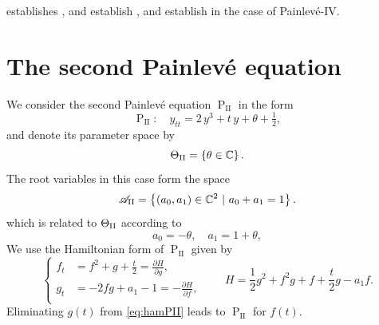 \documentclass[a4paper,reqno]{amsart}
\numberwithin{equation}{section}
\newcommand{\C}{\mathbb{C}}
\newcommand{\pain}[1]{\operatorname{P}_{\mathrm{#1}}}
\numberwithin{equation}{section}
\begin{document}
 establishes ,    and  establish ,
and  establish  in the case of Painlev\'e-IV.


\section{The second Painlev\'e equation}\label{sec:PII}

We consider the second Painlev\'e equation $\pain{II}$ in the form 
\begin{equation*}
\pain{II}:\quad y_{tt}=2\,y^3+t\,y+\theta+\tfrac{1}{2},
\end{equation*}
and denote its parameter space by
\begin{equation*}
    \Theta_{\rm{II}} = \left\{ \theta \in \C \right\}.
\end{equation*}
The root variables in this case form the space
\begin{equation*}
    \mathscr{A}_{\rm{II}} = \left\{ (a_0, a_1) \in \C^2 ~|~ a_0 + a_1 = 1 \right\}.
\end{equation*}
which is related to $\Theta_{\rm{II}}$ according to 
\begin{equation*}
    a_0=-\theta, \quad a_1 = 1 + \theta,
\end{equation*}
We use the Hamiltonian form of $\pain{II}$ given by
\begin{equation} \label{eq:hamPII}
    \left\{
    \begin{aligned}
        f_t &= f^2 + g + \frac{t}{2}  = \frac{\partial H}{\partial g}, \\
        g_t &= -2 f g +a_1 - 1 = -\frac{\partial H}{\partial f},\\
    \end{aligned}
    \right.
    \qquad 
    H = \frac{1}{2}g^2 + f^2 g + f + \frac{t}{2}g - a_1 f.
\end{equation} 
Eliminating $g(t)$ from \eqref{eq:hamPII} leads to $\pain{II}$ for $f(t)$.
\end{document}
